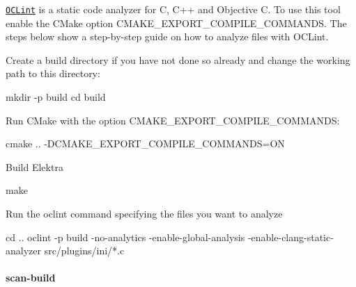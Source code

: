 \href{http://oclint.org/}{\tt O\+C\+Lint} is a static code analyzer for C, C++ and Objective C. To use this tool enable the C\+Make option {\ttfamily C\+M\+A\+K\+E\+\_\+\+E\+X\+P\+O\+R\+T\+\_\+\+C\+O\+M\+P\+I\+L\+E\+\_\+\+C\+O\+M\+M\+A\+N\+DS}. The steps below show a step-\/by-\/step guide on how to analyze files with O\+C\+Lint.


\begin{DoxyEnumerate}
\item Create a build directory if you have not done so already and change the working path to this directory\+:
\end{DoxyEnumerate}


\begin{DoxyCode}
mkdir -p build
cd build
\end{DoxyCode}



\begin{DoxyEnumerate}
\item Run C\+Make with the option {\ttfamily C\+M\+A\+K\+E\+\_\+\+E\+X\+P\+O\+R\+T\+\_\+\+C\+O\+M\+P\+I\+L\+E\+\_\+\+C\+O\+M\+M\+A\+N\+DS}\+:
\end{DoxyEnumerate}


\begin{DoxyCode}
cmake .. -DCMAKE\_EXPORT\_COMPILE\_COMMANDS=ON
\end{DoxyCode}



\begin{DoxyEnumerate}
\item Build Elektra
\end{DoxyEnumerate}


\begin{DoxyCode}
make
\end{DoxyCode}



\begin{DoxyEnumerate}
\item Run the {\ttfamily oclint} command specifying the files you want to analyze
\end{DoxyEnumerate}


\begin{DoxyCode}
cd ..
oclint -p build -no-analytics -enable-global-analysis -enable-clang-static-analyzer src/plugins/ini/*.c
\end{DoxyCode}


\paragraph*{scan-\/build}

